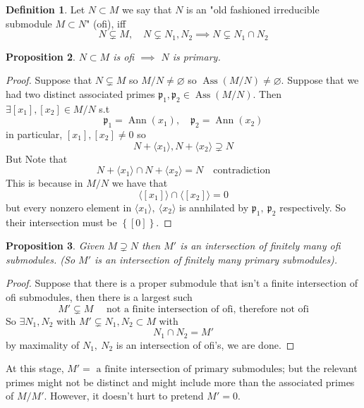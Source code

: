 \documentclass[11pt,a4paper]{article}
\theoremstyle{definition}
\newtheorem{definition}{Definition}[section]
\theoremstyle{plain}
\newtheorem{proposition}[definition]{Proposition}
\theoremstyle{remark}
\renewcommand{\set}[1]{\left\{ #1 \right\}}
\newcommand{\angles}[1]{\langle #1 \rangle}
\newcommand{\Ann}{\operatorname{Ann}}
\newcommand{\Ass}{\operatorname{Ass}}
\begin{document}
\begin{definition}
    Let $N \subset M$ we say that $N$ is an "old fashioned irreducible submodule $M \subset N$" (ofi), iff 
    $$N \subsetneq M, \quad N \subsetneq N_1, N_2 \implies N \subsetneq N_1 \cap N_2$$
\end{definition}

\begin{proposition}
    $N \subset M$ is ofi $\implies$ $N$ is primary.
\end{proposition}

\begin{proof}
    Suppose that $N \subsetneq M$ so $M / N \ne \varnothing$ so $\Ass (M/N) \ne \varnothing$. Suppose that we had two distinct associated primes 
    $\mathfrak{p}_1, \mathfrak{p}_2 \in \Ass (M/N)$. Then $\exists [x_1],[ x_2] \in M/N$ s.t 
    $$\mathfrak{p}_1 = \Ann(x_1), \quad \mathfrak{p}_2 = \Ann(x_2)$$
    in particular, $[x_1], [x_2] \ne 0$ so 
    $$N + \angles{x_1}, N + \angles{x_2} \supsetneq N$$
    But Note that 
    $$ N + \angles{x_1} \cap  N + \angles{x_2} = N \quad \text{contradiction}$$
    This is because in $M /N$ we have that 
    $$\angles{[x_1]} \cap \angles{[x_2]} = 0$$
    but every nonzero element in $\angles{x_1}, \ \angles{x_2}$ is annhilated by $\mathfrak{p}_1, \ \mathfrak{p}_2$ respectively. 
    So their intersection must be $\set{[0]}$.
\end{proof}

\begin{proposition}
    Given $M \supsetneq N$ then $M'$ is an intersection of finitely many ofi submodules. (So $M'$ is an intersection of finitely many primary submodules). 
\end{proposition}

\begin{proof}
    Suppose that there is a proper submodule that isn't a finite intersection of ofi submodules, then there is a largest such 
    $$M' \subsetneq M \quad \text{ not a finite intersection of ofi, therefore not ofi}$$
    So $\exists N_1, N_2$ with $M' \subsetneq N_1, N_2 \subset M$ with 
    $$N_1 \cap N_2 = M'$$
    by maximality of $N_1, \ N_2$ is an intersection of ofi's, we are done. 
\end{proof}

At this stage, $M' = \text{ a finite intersection of primary submodules}$; but the relevant primes might not be distinct and might include more than 
the associated primes of $M/M'$. However, it doesn't hurt to pretend $M' = 0$.
\end{document}
